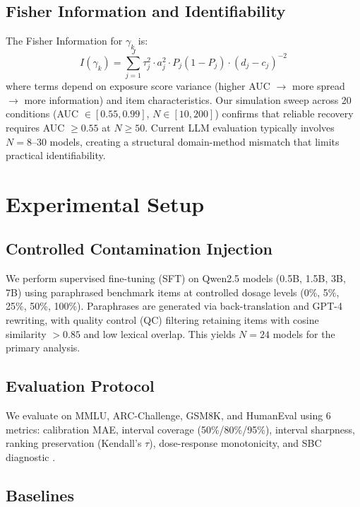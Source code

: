 \documentclass[11pt]{article}
\begin{document}
\subsection{Fisher Information and Identifiability}

The Fisher Information for $\gamma_k$ is:
\begin{equation}
    I(\gamma_k) = \sum_{j=1}^{J} \tau_j^2 \cdot a_j^2 \cdot P_j(1-P_j) \cdot (d_j - c_j)^{-2}
\end{equation}
where terms depend on exposure score variance (higher AUC $\to$ more spread $\to$ more information) and item characteristics. Our simulation sweep across 20 conditions (AUC $\in [0.55, 0.99]$, $N \in [10, 200]$) confirms that reliable recovery requires AUC $\geq 0.55$ at $N \geq 50$. Current LLM evaluation typically involves $N = 8$--$30$ models, creating a structural domain-method mismatch that limits practical identifiability.

\section{Experimental Setup}

\subsection{Controlled Contamination Injection}

We perform supervised fine-tuning (SFT) on Qwen2.5 models (0.5B, 1.5B, 3B, 7B) using paraphrased benchmark items at controlled dosage levels (0\%, 5\%, 25\%, 50\%, 100\%). Paraphrases are generated via back-translation and GPT-4 rewriting, with quality control (QC) filtering retaining items with cosine similarity $> 0.85$ and low lexical overlap. This yields $N=24$ models for the primary analysis.

\subsection{Evaluation Protocol}

We evaluate on MMLU, ARC-Challenge, GSM8K, and HumanEval using 6 metrics: calibration MAE, interval coverage (50\%/80\%/95\%), interval sharpness, ranking preservation (Kendall's $\tau$), dose-response monotonicity, and SBC diagnostic \citep{talts2018validating}.

\subsection{Baselines}
\end{document}
